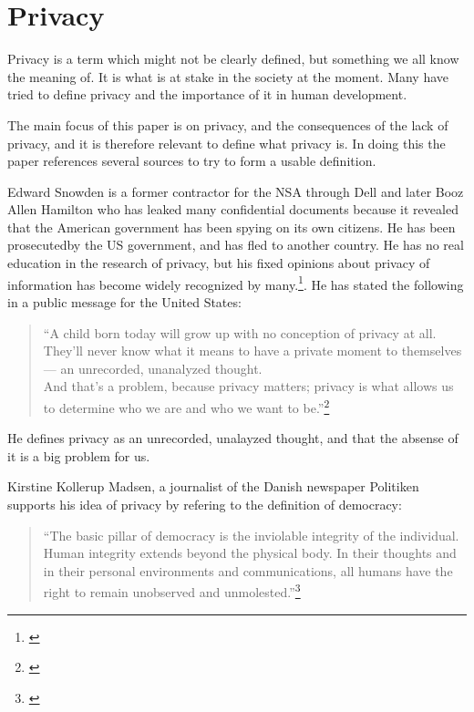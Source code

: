 \section{Privacy}
Privacy is a term which might not be clearly defined, but something we all know the meaning of. It is what is at stake in the society at the moment. Many have tried to define privacy and the importance of it in human development.

The main focus of this paper is on privacy, and the consequences of the lack of privacy, and it is therefore relevant to define what privacy is. In doing this the paper references several sources to try to form a usable definition.

Edward Snowden is a former contractor for the NSA through Dell and later Booz Allen Hamilton who has leaked many confidential documents because it revealed that the American government has been spying on its own citizens. He has been prosecutedby the US government, and has fled to another country. He has no real education in the research of privacy, but his fixed opinions about privacy of information has become widely recognized by many.\footnote{\cite{website:edward-snowden-basic}}. He has stated the following in a public message for the United States:

\blockquote{``A child born today will grow up with no conception of privacy at all. They’ll
never know what it means to have a private moment to themselves — an
unrecorded, unanalyzed thought.\\
And that’s a problem, because privacy matters; privacy is what allows us to
determine who we are and who we want to be.''\footnote{\cite{interview:edward-snowden-christmas}}}
He defines privacy as an unrecorded, unalayzed thought, and that the absense of it is a big problem for us.

Kirstine Kollerup Madsen, a journalist of the Danish newspaper Politiken supports his idea of privacy by refering to the definition of democracy:

\blockquote{``The basic pillar of democracy is the inviolable integrity of the individual. Human integrity extends beyond the physical body. In their thoughts and in their personal environments and communications, all humans have the right to remain unobserved and unmolested.''\footnote{\cite{website:a-stand-for-democracy}}}



\newpage
